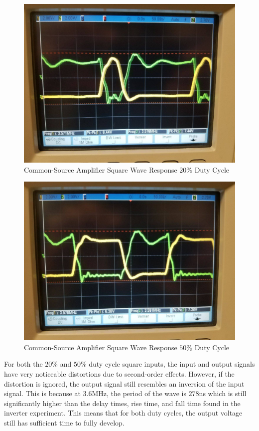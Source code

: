 \FloatBarrier
\begin{figure}[h!]
	\centering
	\includegraphics[scale=0.25]{../images/amplifier_20.jpeg}
	\caption{Common-Source Amplifier Square Wave Response $20\%$ Duty Cycle}
	\label{fig:amplifier_20}
\end{figure}
\FloatBarrier

\FloatBarrier
\begin{figure}[h!]
	\centering
	\includegraphics[scale=0.25]{../images/amplifier_50.jpeg}
	\caption{Common-Source Amplifier Square Wave Response $50\%$ Duty Cycle}
	\label{fig:amplifier_50}
\end{figure}
\FloatBarrier

For both the $20\%$ and $50\%$ duty cycle square inputs, the input and output signals have very noticeable distortions due to second-order effects. However, if the distortion is ignored, the output signal still resembles an inversion of the input signal. This is because at 3.6\si{\mega\hertz}, the period of the wave is $278$\si{\nano\second} which is still significantly higher than the delay times, rise time, and fall time found in the inverter experiment. This means that for both duty cycles, the output voltage still has sufficient time to fully develop.